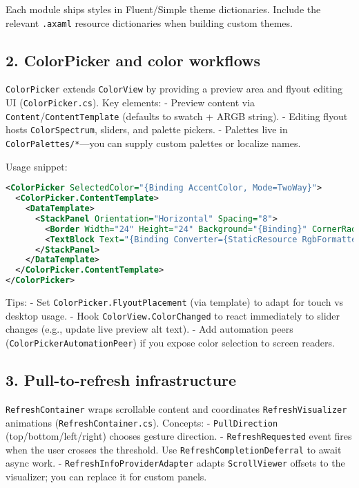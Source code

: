 Each module ships styles in Fluent/Simple theme dictionaries. Include
the relevant \passthrough{\lstinline!.axaml!} resource dictionaries when
building custom themes.

\subsection{2. ColorPicker and color
workflows}\label{colorpicker-and-color-workflows}

\passthrough{\lstinline!ColorPicker!} extends
\passthrough{\lstinline!ColorView!} by providing a preview area and
flyout editing UI (\passthrough{\lstinline!ColorPicker.cs!}). Key
elements: - Preview content via
\passthrough{\lstinline!Content!}/\passthrough{\lstinline!ContentTemplate!}
(defaults to swatch + ARGB string). - Editing flyout hosts
\passthrough{\lstinline!ColorSpectrum!}, sliders, and palette pickers. -
Palettes live in \passthrough{\lstinline!ColorPalettes/*!}---you can
supply custom palettes or localize names.

Usage snippet:

\begin{lstlisting}[language=XML]
<ColorPicker SelectedColor="{Binding AccentColor, Mode=TwoWay}">
  <ColorPicker.ContentTemplate>
    <DataTemplate>
      <StackPanel Orientation="Horizontal" Spacing="8">
        <Border Width="24" Height="24" Background="{Binding}" CornerRadius="4"/>
        <TextBlock Text="{Binding Converter={StaticResource RgbFormatter}}"/>
      </StackPanel>
    </DataTemplate>
  </ColorPicker.ContentTemplate>
</ColorPicker>
\end{lstlisting}

Tips: - Set \passthrough{\lstinline!ColorPicker.FlyoutPlacement!} (via
template) to adapt for touch vs desktop usage. - Hook
\passthrough{\lstinline!ColorView.ColorChanged!} to react immediately to
slider changes (e.g., update live preview alt text). - Add automation
peers (\passthrough{\lstinline!ColorPickerAutomationPeer!}) if you
expose color selection to screen readers.

\subsection{3. Pull-to-refresh
infrastructure}\label{pull-to-refresh-infrastructure}

\passthrough{\lstinline!RefreshContainer!} wraps scrollable content and
coordinates \passthrough{\lstinline!RefreshVisualizer!} animations
(\passthrough{\lstinline!RefreshContainer.cs!}). Concepts: -
\passthrough{\lstinline!PullDirection!} (top/bottom/left/right) chooses
gesture direction. - \passthrough{\lstinline!RefreshRequested!} event
fires when the user crosses the threshold. Use
\passthrough{\lstinline!RefreshCompletionDeferral!} to await async work.
- \passthrough{\lstinline!RefreshInfoProviderAdapter!} adapts
\passthrough{\lstinline!ScrollViewer!} offsets to the visualizer; you
can replace it for custom panels.


